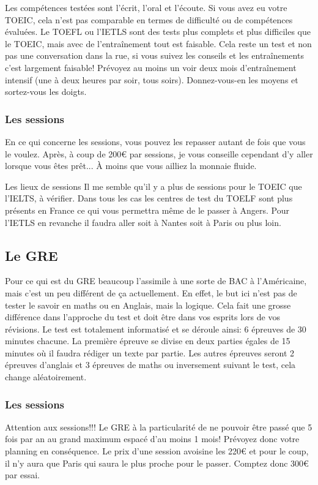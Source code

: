 Les compétences testées sont l’écrit, l’oral et l’écoute. Si vous avez eu votre TOEIC, cela n’est pas comparable en termes de difficulté ou de compétences évaluées. Le TOEFL ou l’IETLS sont des tests plus complets et plus difficiles que le TOEIC, mais avec de l’entraînement tout est faisable. Cela reste un test et non pas une conversation dans la rue, si vous suivez les conseils et les entraînements c’est largement faisable! Prévoyez au moins un voir deux mois d’entraînement intensif (une à deux heures par soir, tous soirs). Donnez-vous-en les moyens et sortez-vous les doigts.

\subsubsection{Les sessions}\label{sec:sec2.2.1.1}
En ce qui concerne les sessions, vous pouvez les repasser autant de fois que vous le voulez. Après, à coup de 200\euro{} par sessions, je vous conseille cependant d’y aller lorsque vous êtes prêt... À moins que vous ailliez la monnaie fluide.

\begin{example}{Les lieux de sessions}
  Il me semble qu’il y a plus de sessions pour le TOEIC que l’IELTS, à vérifier.
  Dans tous les cas les centres de test du TOELF sont plus présents en France ce qui vous permettra même de le passer à Angers. Pour l’IETLS en revanche il faudra aller soit à Nantes soit à Paris ou plus loin.
\end{example}

\subsection{Le GRE}\label{sec:sec2.2.2}
Pour ce qui est du GRE beaucoup l’assimile à une sorte de BAC à l’Américaine, mais c’est un peu différent de ça actuellement. En effet, le but ici n’est pas de tester le savoir en maths ou en Anglais, mais la logique. Cela fait une grosse différence dans l’approche du test et doit être dans vos esprits lors de vos révisions. Le test est totalement informatisé et se déroule ainsi: 6 épreuves de 30 minutes chacune. La première épreuve se divise en deux parties égales de 15 minutes où il faudra rédiger un texte par partie. Les autres épreuves seront 2 épreuves d’anglais et 3 épreuves de maths ou inversement suivant le test, cela change aléatoirement.

\subsubsection{Les sessions}\label{sec:sec2.2.2.1}
Attention aux sessions!!! Le GRE à la particularité de ne pouvoir être passé que 5 fois par an au grand maximum espacé d’au moins 1 mois! Prévoyez donc votre planning en conséquence. Le prix d’une session avoisine les 220\euro{} et pour le coup, il n’y aura que Paris qui saura le plus proche pour le passer. Comptez donc 300\euro{} par essai.

